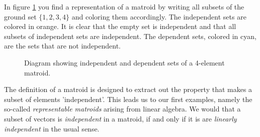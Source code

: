 In  figure \ref{first1234} you find a representation of a matroid by writing all subsets of the ground set $\{1,2,3,4\}$ and coloring them accordingly. The independent sets are colored in orange. It is clear that the empty set is independent and that all subsets of independent sets are independent. The dependent sets, colored in cyan, are the sets that are not independent.


\begin{figure}[h]

\begin{center}
\end{center}
\caption{Diagram showing independent and dependent sets of a 4-element matroid.}
\label{first1234}
\end{figure}


The definition of a matroid is designed to extract out the property that makes a subset of elements 'independent'. This leads us to our first examples, namely the so-called \textit{representable matroids} arising from linear algebra. We would that a subset of vectors is \textit{independent} in a matroid, if and only if it is are \textit{linearly independent} in the usual sense. 



